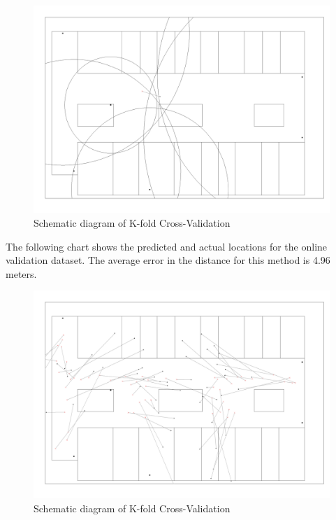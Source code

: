 \documentclass[12pt, conference]{IEEEtran}
\begin{document}
\begin{figure}[htbp]
  \centerline{\includegraphics[width=\columnwidth]{img/circles_real4.png}}
  \caption{Schematic diagram of K-fold Cross-Validation}
  \label{fig: Distance Comparison}
\end{figure}

The following chart shows the predicted and actual locations for the online validation dataset. The average error in the distance for this method is 4.96 meters.

\begin{figure}[htbp]
  \centerline{\includegraphics[width=\columnwidth]{img/Multilateration_Error.png}}
  \caption{Schematic diagram of K-fold Cross-Validation}
  \label{fig: Trilateration Floor Plan}
\end{figure}
\end{document}
